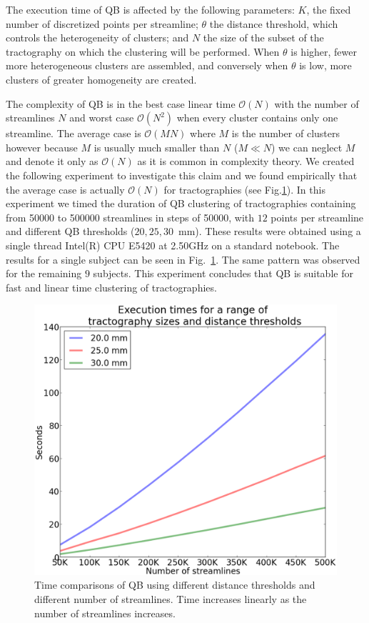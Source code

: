 \documentclass{bioinfo}
\begin{document}
The execution time of QB is affected by the following parameters: $K$,
the fixed number of discretized points per streamline; $\theta$ the
distance threshold, which controls the heterogeneity of clusters; and
$N$ the size of the subset of the tractography on which the clustering
will be performed. When $\theta$ is higher, fewer more heterogeneous
clusters are assembled, and conversely when $\theta$ is low, more
clusters of greater homogeneity are created.

The complexity of QB is in the best case linear time $\mathcal{O}(N)$
with the number of streamlines $N$ and worst case $\mathcal{O}(N^{2})$
when every cluster contains only one streamline. The average case is
$\mathcal{O}(MN)$ where $M$ is the number of clusters however because
$M$ is usually much smaller than $N$ ($M\ll N$) we can neglect $M$ and
denote it only as $\mathcal{O}(N)$ as it is common in complexity
theory. We created the following experiment to investigate this claim
and we found empirically that the average case is actually
$\mathcal{O}(N)$ for tractographies (see Fig.\ref{Flo:Speed1}).  In this
experiment we timed the duration of QB clustering of tractographies
containing from \num{50000} to \num{500000} streamlines in steps of
\num{50000}, with $12$ points per streamline and different QB thresholds
($20,25,30$~mm). These results were obtained using a single thread
Intel(R) CPU E5420 at 2.50GHz on a standard notebook. The results for a
single subject can be seen in Fig.~\ref{Flo:Speed1}. The same pattern
was observed for the remaining $9$ subjects. This experiment concludes
that QB is suitable for fast and linear time clustering of
tractographies.

\begin{figure}
\noindent \begin{centering}
\includegraphics[scale=0.3]{Figures/Fig_3_timings}
\par\end{centering}
\caption{Time comparisons of QB using different distance thresholds and
  different number of streamlines. Time increases linearly as the number
  of streamlines increases. \label{Flo:Speed1}}
\end{figure}
\end{document}
